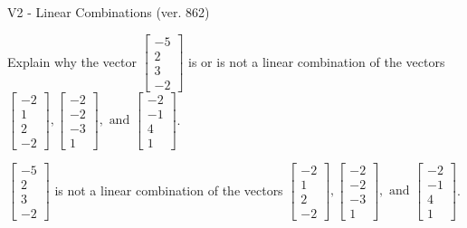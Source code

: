 \begin{exercise}
  \begin{exerciseTitle}V2 - Linear Combinations (ver. 862)\end{exerciseTitle}
  \begin{exerciseStatement}
    Explain why the vector \(\left[\begin{array}{c}
-5 \\
2 \\
3 \\
-2
\end{array}\right]\)  is or is not a linear 
	combination of the vectors \(\left[\begin{array}{c}
-2 \\
1 \\
2 \\
-2
\end{array}\right] , \left[\begin{array}{c}
-2 \\
-2 \\
-3 \\
1
\end{array}\right] , \text{ and } \left[\begin{array}{c}
-2 \\
-1 \\
4 \\
1
\end{array}\right]\).
	


  \end{exerciseStatement}
  \begin{exerciseAnswer}
   \(\left[\begin{array}{c}
-5 \\
2 \\
3 \\
-2
\end{array}\right]\) 
  	 is not  
	a linear combination of the vectors \(\left[\begin{array}{c}
-2 \\
1 \\
2 \\
-2
\end{array}\right] , \left[\begin{array}{c}
-2 \\
-2 \\
-3 \\
1
\end{array}\right] , \text{ and } \left[\begin{array}{c}
-2 \\
-1 \\
4 \\
1
\end{array}\right]\).

	
  


  \end{exerciseAnswer}
\end{exercise}